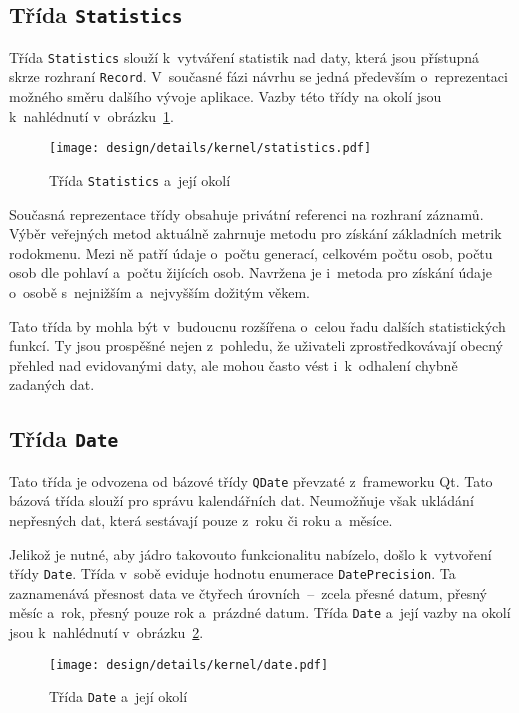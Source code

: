 		\subsection*{Třída \texttt{Statistics}}
		Třída \texttt{Statistics} slouží k~vytváření statistik nad daty, která jsou přístupná skrze rozhraní \texttt{Record}. V~současné fázi návrhu se jedná především o~reprezentaci možného směru dalšího vývoje aplikace. Vazby této třídy na okolí jsou k~nahlédnutí v~obrázku~\ref{fig:designDetailStatistics}. \par
		\begin{figure}[h]
			\centering
			\texttt{[image: design/details/kernel/statistics.pdf]}
			\caption{Třída \texttt{Statistics} a~její okolí}
			\label{fig:designDetailStatistics}
		\end{figure}
		Současná reprezentace třídy obsahuje privátní referenci na rozhraní záznamů. Výběr veřejných metod aktuálně zahrnuje metodu pro získání základních metrik rodokmenu. Mezi ně patří údaje o~počtu generací, celkovém počtu osob, počtu osob dle pohlaví a~počtu žijících osob. Navržena je i~metoda pro získání údaje o~osobě s~nejnižším a~nejvyšším dožitým věkem. \par
		Tato třída by mohla být v~budoucnu rozšířena o~celou řadu dalších statistických funkcí. Ty jsou prospěšné nejen z~pohledu, že uživateli zprostředkovávají obecný přehled nad evidovanými daty, ale mohou často vést i~k~odhalení chybně zadaných dat. \par
		
		\subsection*{Třída \texttt{Date}}
		Tato třída je odvozena od bázové třídy \texttt{QDate} převzaté z~frameworku Qt. Tato bázová třída slouží pro správu kalendářních dat. Neumožňuje však ukládání nepřesných dat, která sestávají pouze z~roku či roku a~měsíce. \par
		Jelikož je nutné, aby jádro takovouto funkcionalitu nabízelo, došlo k~vytvoření třídy \texttt{Date}. Třída v~sobě eviduje hodnotu enumerace \texttt{DatePrecision}. Ta zaznamenává přesnost data ve čtyřech úrovních~--~zcela přesné datum, přesný měsíc a~rok, přesný pouze rok a~prázdné datum. Třída \texttt{Date} a~její vazby na okolí jsou k~nahlédnutí v~obrázku~\ref{fig:designDetailDate}.\par
		\begin{figure}[h]
			\centering
			\texttt{[image: design/details/kernel/date.pdf]}
			\caption{Třída \texttt{Date} a~její okolí}
			\label{fig:designDetailDate}
		\end{figure}
	
